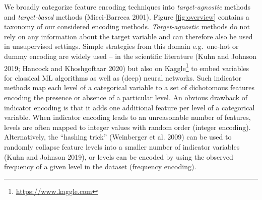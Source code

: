 \documentclass[smallextended]{svjour3}       %
\begin{document}
We broadly categorize feature encoding techniques into \emph{target-agnostic} methods and \emph{target-based} methods (Micci-Barreca 2001).
Figure \ref{fig:overview} contains a taxonomy of our considered encoding methods. \emph{Target-agnostic} methods do not rely on any information about the target variable and can therefore also be used in unsupervised settings.
Simple strategies from this domain e.g.~one-hot or dummy encoding are widely used -- in the scientific literature (Kuhn and Johnson 2019; Hancock and Khoshgoftaar 2020) but also on Kaggle\footnote{\url{https://www.kaggle.com}} to embed variables for classical ML algorithms as well as (deep) neural networks.
Such indicator methods map each level of a categorical variable to a set of dichotomous features encoding the presence or absence of a particular level.
An obvious drawback of indicator encoding is that it adds one additional feature per level of a categorical variable.
When indicator encoding leads to an unreasonable number of features, levels are often mapped to integer values with random order (integer encoding). Alternatively, the ``hashing trick'' (Weinberger et al. 2009) can be used to randomly collapse feature levels into a smaller number of indicator variables (Kuhn and Johnson 2019), or levels can be encoded by using the observed frequency of a given level in the dataset (frequency encoding).
\end{document}
